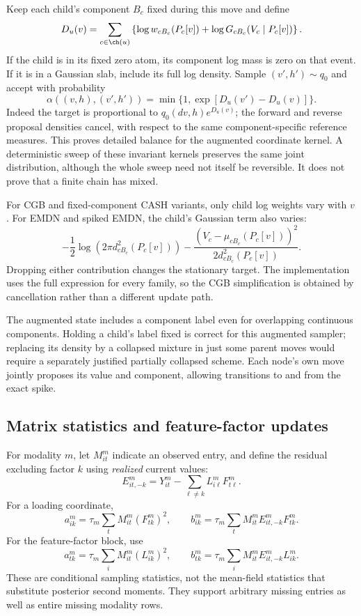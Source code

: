 Keep each child's component \(B_c\) fixed during this move and define
\begin{equation}
D_u(v)=\sum_{c\in\ch(u)}
\left\{\log w_{cB_c}(P_c[v])
       +\log G_{cB_c}(V_c\mid P_c[v])\right\}.
\label{eq:implementedmessage}
\end{equation}
If the child is in its fixed zero atom, its component log mass is zero
on that event. If it is in a Gaussian slab, include its full log density.
Sample \((v',h')\sim q_0\) and accept with probability
\begin{equation}
\alpha((v,h),(v',h'))=\min\{1,\exp[D_u(v')-D_u(v)]\}.
\label{eq:implementedaccept}
\end{equation}
Indeed the target is proportional to \(q_0(dv,h)e^{D_u(v)}\);
the forward and reverse proposal densities cancel, with respect to the
same component-specific reference measures. This proves detailed balance
for the augmented coordinate kernel. A deterministic sweep of these
invariant kernels preserves the same joint distribution, although the
whole sweep need not itself be reversible. It does not prove that a
finite chain has mixed.

For CGB and fixed-component CASH variants, only child log weights vary
with \(v\). For EMDN and spiked EMDN, the child's Gaussian term also varies:
\[
-\frac12\log(2\pi d_{cB_c}^2(P_c[v]))
-\frac{(V_c-\mu_{cB_c}(P_c[v]))^2}
       {2d_{cB_c}^2(P_c[v])}.
\]
Dropping either contribution changes the stationary target. The implementation
uses the full expression for every family, so the CGB simplification is
obtained by cancellation rather than a different update path.

The augmented state includes a component label even for overlapping
continuous components. Holding a child's label fixed is correct for this
augmented sampler; replacing its density by a collapsed mixture in just
some parent moves would require a separately justified partially collapsed
scheme. Each node's own move jointly proposes its value and component,
allowing transitions to and from the exact spike.

\subsection{Matrix statistics and feature-factor updates}
For modality \(m\), let \(M^m_{it}\) indicate an observed entry, and define
the residual excluding factor \(k\) using \emph{realized} current values:
\[
E^m_{it,-k}=Y^m_{it}-\sum_{\ell\ne k}L^m_{i\ell}F^m_{t\ell}.
\]
For a loading coordinate,
\[
a^m_{ik}=\tau_m\sum_tM^m_{it}(F^m_{tk})^2,\qquad
b^m_{ik}=\tau_m\sum_tM^m_{it}E^m_{it,-k}F^m_{tk}.
\]
For the feature-factor block, use
\[
a^m_{tk}=\tau_m\sum_iM^m_{it}(L^m_{ik})^2,\qquad
b^m_{tk}=\tau_m\sum_iM^m_{it}E^m_{it,-k}L^m_{ik}.
\]
These are conditional sampling statistics, not the mean-field statistics
that substitute posterior second moments. They support arbitrary missing
entries as well as entire missing modality rows.


